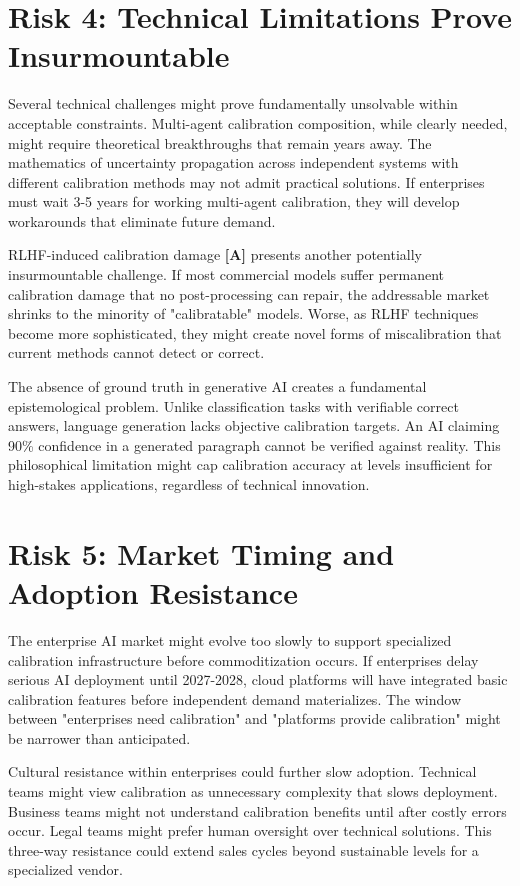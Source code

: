 \documentclass[a4paper,11pt]{article}
\newcommand{\alabel}{\textbf{\textcolor{acolor}{[A]}}}
\begin{document}
\section{Risk 4: Technical Limitations Prove Insurmountable}

Several technical challenges might prove fundamentally unsolvable within acceptable constraints. Multi-agent calibration composition, while clearly needed, might require theoretical breakthroughs that remain years away. The mathematics of uncertainty propagation across independent systems with different calibration methods may not admit practical solutions. If enterprises must wait 3-5 years for working multi-agent calibration, they will develop workarounds that eliminate future demand.


RLHF-induced calibration damage \alabel{} presents another potentially insurmountable challenge. If most commercial models suffer permanent calibration damage that no post-processing can repair, the addressable market shrinks to the minority of "calibratable" models. Worse, as RLHF techniques become more sophisticated, they might create novel forms of miscalibration that current methods cannot detect or correct.


The absence of ground truth in generative AI creates a fundamental epistemological problem. Unlike classification tasks with verifiable correct answers, language generation lacks objective calibration targets. An AI claiming 90\% confidence in a generated paragraph cannot be verified against reality. This philosophical limitation might cap calibration accuracy at levels insufficient for high-stakes applications, regardless of technical innovation.


\section{Risk 5: Market Timing and Adoption Resistance}

The enterprise AI market might evolve too slowly to support specialized calibration infrastructure before commoditization occurs. If enterprises delay serious AI deployment until 2027-2028, cloud platforms will have integrated basic calibration features before independent demand materializes. The window between "enterprises need calibration" and "platforms provide calibration" might be narrower than anticipated.


Cultural resistance within enterprises could further slow adoption. Technical teams might view calibration as unnecessary complexity that slows deployment. Business teams might not understand calibration benefits until after costly errors occur. Legal teams might prefer human oversight over technical solutions. This three-way resistance could extend sales cycles beyond sustainable levels for a specialized vendor.
\end{document}
